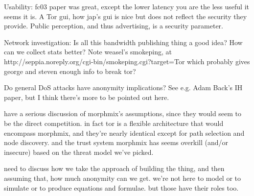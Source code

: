 \documentclass[twocolumn]{article}
\begin{document}
Usability: fc03 paper was great, except the lower latency you are the
less useful it seems it is.
A Tor gui, how jap's gui is nice but does not reflect the security
they provide.
Public perception, and thus advertising, is a security parameter.

Network investigation: Is all this bandwidth publishing thing a good idea?
How can we collect stats better? Note weasel's smokeping, at
http://seppia.noreply.org/cgi-bin/smokeping.cgi?target=Tor
which probably gives george and steven enough info to break tor?

Do general DoS attacks have anonymity implications? See e.g. Adam
Back's IH paper, but I think there's more to be pointed out here.


have a serious discussion of morphmix's assumptions, since they would
seem to be the direct competition. in fact tor is a flexible architecture
that would encompass morphmix, and they're nearly identical except for
path selection and node discovery. and the trust system morphmix has
seems overkill (and/or insecure) based on the threat model we've picked.

need to discuss how we take the approach of building the thing, and then
assuming that, how much anonymity can we get. we're not here to model or
to simulate or to produce equations and formulae. but those have their
roles too.
\end{document}
